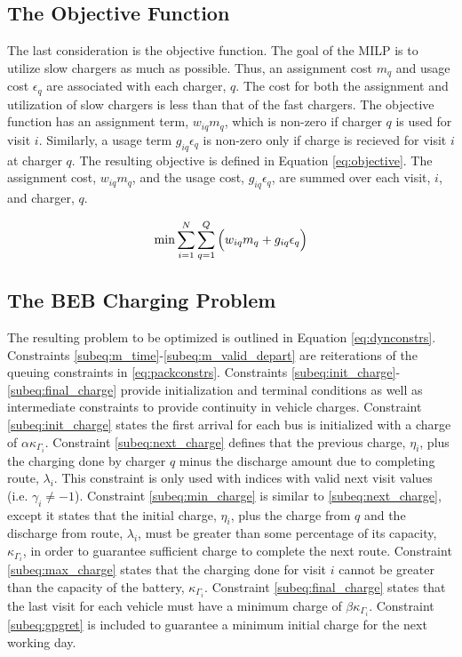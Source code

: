 \documentclass[letterpaper, 10pt, conference]{IEEEtran}
\begin{document}
\subsection{The Objective Function} \label{sec:objective-function}
The last consideration is the objective function. The goal of the MILP is to utilize slow chargers as much as possible.
Thus, an assignment cost $m_q$ and usage cost $\epsilon_q$ are associated with each charger, $q$. The cost for both the
assignment and utilization of slow chargers is less than that of the fast chargers. The objective function has an
assignment term, $w_{iq}m_q$, which is non-zero if charger $q$ is used for visit $i$. Similarly, a usage term $g_{iq}
\epsilon_q$ is non-zero only if charge is recieved for visit $i$ at charger $q$. The resulting objective is defined in Equation
\ref{eq:objective}. The assignment cost, $w_{iq}m_q$, and the usage cost, $g_{iq}\epsilon_q$, are summed over each visit, $i$,
and charger, $q$.

\begin{equation}
\label{eq:objective}
	\min \sum_{i=1}^N \sum_{q=1}^Q \Big( w_{iq} m_q + g_{iq} \epsilon_q \Big) \\
\end{equation}

\subsection{The BEB Charging Problem}
The resulting problem to be optimized is outlined in Equation \ref{eq:dynconstrs}. Constraints
\eqref{subeq:m_time}-\eqref{subeq:m_valid_depart} are reiterations of the queuing constraints in \eqref{eq:packconstrs}.
Constraints \eqref{subeq:init_charge}-\eqref{subeq:final_charge} provide initialization and terminal conditions as well
as intermediate constraints to provide continuity in vehicle charges. Constraint \eqref{subeq:init_charge} states the
first arrival for each bus is initialized with a charge of $\alpha \kappa_{\Gamma_i}$. Constraint \eqref{subeq:next_charge} defines
that the previous charge, $\eta_i$, plus the charging done by charger $q$ minus the discharge amount due to completing
route, $\lambda_i$. This constraint is only used with indices with valid next visit values (i.e. $\gamma_i \neq -1$). Constraint
\eqref{subeq:min_charge} is similar to \eqref{subeq:next_charge}, except it states that the initial charge, $\eta_i$, plus
the charge from $q$ and the discharge from route, $\lambda_i$, must be greater than some percentage of its capacity,
$\kappa_{\Gamma_i}$, in order to guarantee sufficient charge to complete the next route. Constraint \eqref{subeq:max_charge}
states that the charging done for visit $i$ cannot be greater than the capacity of the battery, $\kappa_{\Gamma_i}$. Constraint
\eqref{subeq:final_charge} states that the last visit for each vehicle must have a minimum charge of $\beta \kappa_{\Gamma_i}$.
Constraint \eqref{subeq:gpgret} is included to guarantee a minimum initial charge for the next working day.
\end{document}
